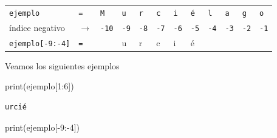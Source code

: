 \documentclass[
  spanish,
  letterpaper,
]{scrbook}
\newenvironment{Shaded}{\begin{snugshade}}{\end{snugshade}}
\newcommand{\BuiltInTok}[1]{\textcolor[rgb]{0.00,0.23,0.31}{#1}}
\newcommand{\DecValTok}[1]{\textcolor[rgb]{0.68,0.00,0.00}{#1}}
\newcommand{\NormalTok}[1]{\textcolor[rgb]{0.00,0.23,0.31}{#1}}
\newcommand{\OperatorTok}[1]{\textcolor[rgb]{0.37,0.37,0.37}{#1}}
\theoremstyle{definition}
\theoremstyle{remark}
\begin{document}
\begin{longtable}[]{@{}
  >{\raggedleft\arraybackslash}p{}
  >{\centering\arraybackslash}p{}
  >{\centering\arraybackslash}p{}
  >{\centering\arraybackslash}p{}
  >{\centering\arraybackslash}p{}
  >{\centering\arraybackslash}p{}
  >{\centering\arraybackslash}p{}
  >{\centering\arraybackslash}p{}
  >{\centering\arraybackslash}p{}
  >{\centering\arraybackslash}p{}
  >{\centering\arraybackslash}p{}
  >{\centering\arraybackslash}p{}@{}}
\toprule\noalign{}
\endhead
\bottomrule\noalign{}
\endlastfoot
\texttt{ejemplo} & \texttt{=} & \texttt{M} & \texttt{u} & \texttt{r} &
\texttt{c} & \texttt{i} & \texttt{é} & \texttt{l} & \texttt{a} &
\texttt{g} & \texttt{o} \\
índice negativo & \(\rightarrow\) & \texttt{-10} & \texttt{-9} &
\texttt{-8} & \texttt{-7} & \texttt{-6} & \texttt{-5} & \texttt{-4} &
\texttt{-3} & \texttt{-2} & \texttt{-1} \\
\texttt{ejemplo{[}-9:-4{]}} & \texttt{=} & & u & r & c & i & é & & &
& \\
\end{longtable}

Veamos los siguientes ejemplos

\begin{Shaded}
\begin{Highlighting}[]
\BuiltInTok{print}\NormalTok{(ejemplo[}\DecValTok{1}\NormalTok{:}\DecValTok{6}\NormalTok{])}
\end{Highlighting}
\end{Shaded}

\begin{verbatim}
urcié
\end{verbatim}

\begin{Shaded}
\begin{Highlighting}[]
\BuiltInTok{print}\NormalTok{(ejemplo[}\OperatorTok{{-}}\DecValTok{9}\NormalTok{:}\OperatorTok{{-}}\DecValTok{4}\NormalTok{])}
\end{Highlighting}
\end{Shaded}
\end{document}
